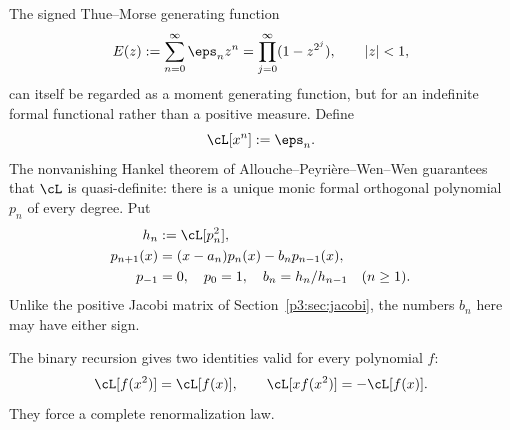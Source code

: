 \documentclass[11pt,oneside]{article}
\theoremstyle{definition}
\begin{document}
The signed Thue--Morse generating function
\begin{equation}
 E(z):=\sum_{n=0}^{\infty}\eps_nz^n
      =\prod_{j=0}^{\infty}(1-z^{2^j}),\qquad |z|<1,        \label{p3:eq:E-repeat}
\end{equation}
can itself be regarded as a moment generating function, but for an indefinite formal
functional rather than a positive measure.  Define
\begin{equation}
 \cL[x^n]:=\eps_n.                                  \label{p3:eq:L-tm}
\end{equation}
The nonvanishing Hankel theorem of Allouche--Peyri\`ere--Wen--Wen \cite{p3:APWW,p3:BugeaudHan} guarantees that
\(\cL\) is quasi-definite: there is a unique monic formal orthogonal polynomial
\(p_n\) of every degree.  Put
\begin{align}
 h_n&:=\cL[p_n^2],                                  \label{p3:eq:tm-hn}\\
 p_{n+1}(x)&=(x-a_n)p_n(x)-b_np_{n-1}(x),                  \label{p3:eq:tm-monic-rec}\\
 p_{-1}&=0,
 \quad p_0=1,
 \quad b_n=h_n/h_{n-1}\quad(n\ge1).                       \label{p3:eq:tm-bnorm}
\end{align}
Unlike the positive Jacobi matrix of Section~\ref{p3:sec:jacobi}, the numbers \(b_n\) here
may have either sign.

The binary recursion gives two identities valid for every polynomial \(f\):
\begin{equation}
 \cL[f(x^2)]=\cL[f(x)],
 \qquad
 \cL[xf(x^2)]=-\cL[f(x)].                    \label{p3:eq:L-quadratic}
\end{equation}
They force a complete renormalization law.
\end{document}
